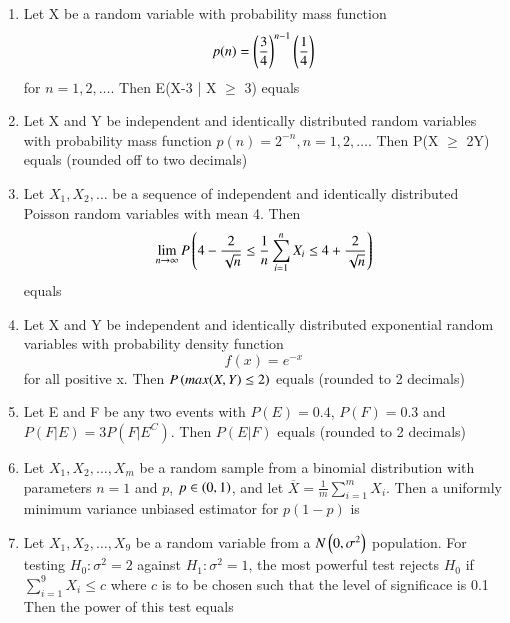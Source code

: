 \documentclass[journal]{IEEEtran}
\begin{document}
\begin{enumerate}
\begin{enumerate}
		\end{enumerate}
	\item Let X be a random variable with probability mass function 
		$$ p(n) = \left(\frac{3}{4}\right)^{n-1} \left(\frac{1}{4}\right) $$ for $n = 1, 2, \dots $. Then E(X-3 | X $\geq$ 3) equals
	\item Let X and Y be independent and identically distributed random variables with probability mass function $p(n) = 2^{-n}, n=1,2,\dots$. Then P(X $\geq$ 2Y) equals (rounded off to two decimals)
	\item Let $X_1, X_2, \dots$ be a sequence of independent and identically distributed Poisson random variables with mean 4. Then 
		$$ \lim_{n \to \infty} P \left(4 - \frac{2}{\sqrt{n}} \leq \frac{1}{n} \sum_{i=1}^{n} X_i \leq 4 + \frac{2}{\sqrt{n}}\right) $$ equals
	\item Let X and Y be independent and identically distributed exponential random variables with probability density function 
		$$ f(x) = e^{-x} $$ for all positive x. Then $P \left(max(X,Y) \leq 2\right) $ equals (rounded to 2 decimals)
	\item Let E and F be any two events with $P(E) = 0.4$, $P(F) = 0.3$ and $P(F|E) = 3P(F|E^C)$. Then $P(E|F)$ equals (rounded to 2 decimals)
	\item Let $X_1, X_2, \dots, X_m$ be a random sample from a binomial distribution with parameters $n=1$ and $p$, $p \in \left(0,1\right)$, and let $\overline{X} = \frac{1}{m} \sum_{i=1}^{m} X_i$. Then a uniformly minimum variance unbiased estimator for $p(1-p)$ is
		\begin{enumerate}
		\end{enumerate}
	\item Let $X_1, X_2, \dots, X_9$ be a random variable from a $N \left(0, \sigma ^2\right)$ population. For testing $H_0 : \sigma ^2 = 2$ against $H_1 : \sigma ^2 = 1$, the most  powerful test rejects $H_0$ if $\sum_{i=1}^{9} X_i \leq c $ where $c$ is to be chosen such that the level of significace is 0.1 Then the power of this test equals

\end{enumerate}
\end{document}
